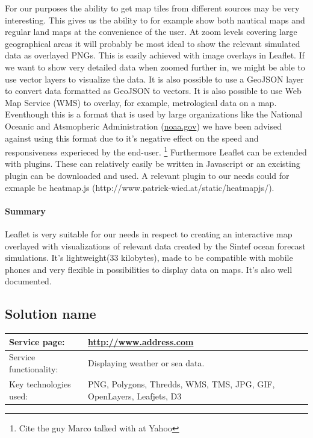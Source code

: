 \documentclass[11pt,a4paper,titlepage,oneside]{report}
\begin{document}
  For our purposes the ability to get map tiles from different sources may be very interesting. This gives us the ability to for example show both nautical maps and regular land maps at the convenience of the user. At zoom levels covering large geographical areas it will probably be most ideal to show the relevant simulated data as overlayed PNGs. This is easily achieved with image overlays in Leaflet. If we want to show very detailed data when zoomed further in, we might be able to use vector layers to visualize the data. It is also possible to use a GeoJSON layer to convert data formatted as GeoJSON to vectors.
  It is also possible to use Web Map Service (WMS) to overlay, for example, metrological data on a map. Eventhough this is a format that is used by large organizations like the National Oceanic and Atsmopheric Administration (\url{noaa.gov}) we have been advised against using this format due to it's negative effect on the speed and responsiveness experieced by the end-user. \footnote{Cite the guy Marco talked with at Yahoo}
  Furthermore Leaflet can be extended with plugins. These can relatively easily be written in Javascript or an excisting plugin can be downloaded and used. A relevant plugin to our needs could for exmaple be heatmap.js (http://www.patrick-wied.at/static/heatmapjs/).

  \paragraph{Summary}
  Leaflet is very suitable for our needs in respect to creating an interactive map overlayed with visualizations of relevant data created by the Sintef ocean forecast simulations. It's lightweight(33 kilobytes), made to be compatible with mobile phones and very flexible in possibilities to display data on maps. It's also well documented.

\subsection{Solution name}
\begin{tabular}{|p{4cm}|p{8cm}|}

\hline
Service page: & \url{http://www.address.com} \\%
\hline
Service functionality: & Displaying weather or sea data. \\
\hline
Key technologies used: & PNG, Polygons, Thredds, WMS, TMS, JPG, GIF, OpenLayers, Leafjets, D3 \\
\hline
\end{tabular}
\end{document}
